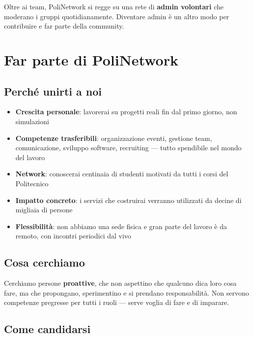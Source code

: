 \documentclass[11pt,a4paper]{article}
\begin{document}
\vspace{0.5em}

Oltre ai team, PoliNetwork si regge su una rete di
\textbf{admin volontari} che moderano i gruppi quotidianamente.
Diventare admin è un altro modo per contribuire e far parte della
community.

\section{Far parte di PoliNetwork}

\subsection{Perché unirti a noi}

\begin{itemize}[leftmargin=2em]
    \item \textbf{Crescita personale}: lavorerai su progetti reali
          fin dal primo giorno, non simulazioni
    \item \textbf{Competenze trasferibili}: organizzazione eventi,
          gestione team, comunicazione, sviluppo software, recruiting
          — tutto spendibile nel mondo del lavoro
    \item \textbf{Network}: conoscerai centinaia di studenti
          motivati da tutti i corsi del Politecnico
    \item \textbf{Impatto concreto}: i servizi che costruirai
          verranno utilizzati da decine di migliaia di persone
    \item \textbf{Flessibilità}: non abbiamo una sede fisica e gran
          parte del lavoro è da remoto, con incontri periodici
          dal vivo
\end{itemize}

\subsection{Cosa cerchiamo}

Cerchiamo persone \textbf{proattive}, che non aspettino che qualcuno
dica loro cosa fare, ma che propongano, sperimentino e si prendano
responsabilità. Non servono competenze pregresse per tutti i ruoli
— serve voglia di fare e di imparare.

\subsection{Come candidarsi}
\end{document}
